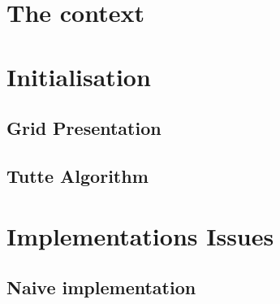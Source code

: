 \documentclass[12pt]{report}
\begin{document}






\begin{abstract}

\end{abstract}

\tableofcontents
\listoffigures







\chapter{The context}

%

\chapter{Initialisation}

\section{Grid Presentation}

\section{Tutte Algorithm}





\chapter{Implementations Issues}

\section{Naive implementation}
\end{document}
